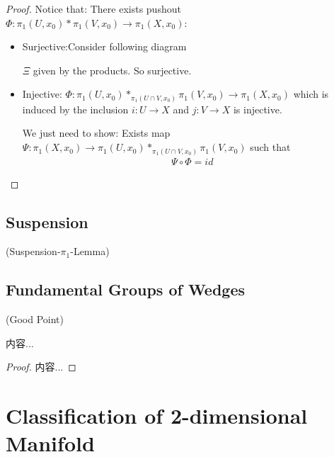 \documentclass[Total.tex]{subfiles}
\begin{document}
		\begin{proof}
			Notice that: There exists pushout $\Phi:\pi_1(U,x_0)*\pi_1(V,x_0)\rightarrow \pi_1(X,x_0)$:
			\begin{itemize}
				\item Surjective:Consider following diagram
				\begin{center}
				\end{center}
				$\Xi$ given by the products. So surjective.
				\item Injective: $\Phi:\pi_1(U,x_0)*_{\pi_1(U\cap V,x_0)} \pi_1(V,x_0)\rightarrow \pi_1(X,x_0)$ which is induced by the inclusion $i:U\rightarrow X$ and $j:V\rightarrow X$ is injective.
				
				We just need to show: Exists map  $\Psi:\pi_1(X,x_0)\rightarrow \pi_1(U,x_0)*_{\pi_1(U\cap V,x_0)} \pi_1(V,x_0)$ such that 
				\begin{gather*}
					\Psi\circ \Phi=id
				\end{gather*}
			\end{itemize}
		\end{proof}
		\subsection{Suspension}
		\begin{Def}
			
		\end{Def}
		\begin{lemma}
			(Suspension-$\pi_1$-Lemma)
		\end{lemma}
		\subsection{Fundamental Groups of Wedges}
		\begin{Def}
			(Good Point) 
		\end{Def}
		
		\begin{lemma}
			内容...
		\end{lemma}
		\begin{proof}
			内容...
		\end{proof}
		\section{Classification of 2-dimensional Manifold}
\end{document}
